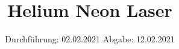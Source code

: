 

\subject{V61}
\title{Helium Neon Laser}
\date{%
  Durchführung: 02.02.2021
  \hspace{3em}
  Abgabe: 12.02.2021
}



\maketitle
\thispagestyle{empty}
\tableofcontents
\newpage






\printbibliography{}



